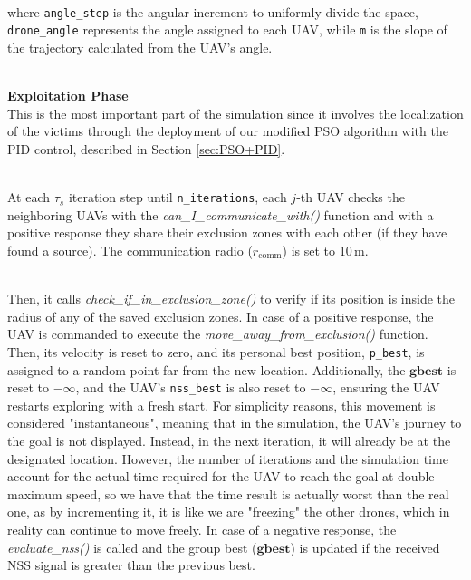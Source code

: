 \documentclass[main]{subfiles}
\begin{document}
\noindent\\
where \texttt{angle\_step} is the angular increment to uniformly divide the space,
\texttt{drone\_angle} represents the angle assigned to each UAV, 
while \texttt{m} is the slope of the trajectory calculated from the UAV's angle. 

\noindent\\
\textbf{Exploitation Phase}\noindent\\
This is the most important part of the simulation since it involves
the localization of the victims through the deployment of our modified PSO
algorithm with the PID control, described in Section \ref{sec:PSO+PID}.

\noindent\\
At each $\tau_s$ iteration step until \texttt{n\_iterations},
each $j$-th UAV checks the neighboring UAVs with the
\textit{can\_I\_communicate\_with()} function and with a 
positive response they share their exclusion zones with each other
(if they have found a source). The communication radio (\(r_{\text{comm}}\))
is set to 10\,m.

\noindent\\
Then, it calls \textit{check\_if\_in\_exclusion\_zone()}
to verify if its position is inside the radius of any of the 
saved exclusion zones.
In case of a positive response, the UAV is commanded to 
execute the \textit{move\_away\_from\_exclusion()} function. 
Then, its velocity is reset to zero, and its personal 
best position, \texttt{p\_best}, is assigned to a random point 
far from the new location. Additionally, the $\mathbf{gbest}$ 
is reset to \(-\infty\), and the 
UAV's \texttt{nss\_best} is also reset to \(-\infty\), 
ensuring the UAV restarts exploring with a fresh start.
For simplicity reasons, this movement is considered "instantaneous", 
meaning that in the simulation, the UAV's journey to the goal is 
not displayed. Instead, in the next iteration, it will already 
be at the designated location. However, the number of 
iterations and the simulation time account for the actual 
time required for the UAV to reach the goal at double maximum speed,
so we have that the time result is actually worst than the real one,
as by incrementing it, it is like we are "freezing" the other drones, which in reality can continue
to move freely.
In case of a negative response, the \textit{evaluate\_nss()} is 
called and the group best ($\mathbf{gbest}$) is updated if the received NSS signal 
is greater than the previous best.
\end{document}

